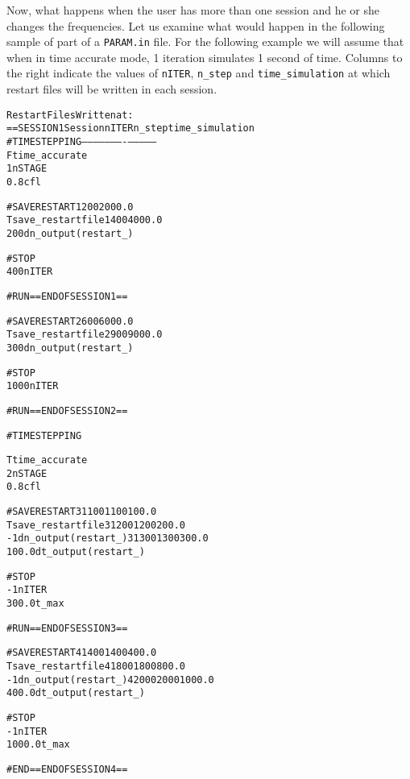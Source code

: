 Now, what happens when the user has more than one session and he or she
changes the frequencies.  Let us examine what would happen in the following
sample of part of a {\tt PARAM.in} file.  For the following example we will
assume that when in time accurate mode, 1 iteration simulates 1 second of time.
Columns to the right indicate the values of {\tt nITER}, {\tt n\_step} and
{\tt time\_simulation} at which restart files will be written in each session.
\begin{alltt}
                                             Restart Files Written at:
==SESSION 1       \hfill        Session   nITER   n_step   time_simulation
#TIMESTEPPING	  \hfill        --------  ------  -------  --------------
F       time_accurate  
1       nSTAGE         
0.8     cfl            

#SAVERESTART                      \hfill  1       200      200              0.0  
T            save_restartfile     \hfill  1       400      400              0.0
200          dn_output(restart_)

#STOP
400          nITER

#RUN ==END OF SESSION 1== 
                         
#SAVERESTART			  \hfill  2       600      600              0.0
T            save_restartfile	  \hfill  2       900      900              0.0
300          dn_output(restart_)
				
#STOP				
1000         nITER				
				
#RUN ==END OF SESSION 2== 
                          
#TIMESTEPPING 			
				
T       time_accurate  		
2       nSTAGE         		
0.8     cfl            		
				
#SAVERESTART			  \hfill  3      1100     1100            100.0
T            save_restartfile	  \hfill  3      1200     1200            200.0
-1           dn_output(restart_)  \hfill  3      1300     1300            300.0
100.0        dt_output(restart_)
				
#STOP				
-1           nITER				
300.0        t_max			
				
#RUN ==END OF SESSION 3== 
                          
#SAVERESTART                      \hfill   4      1400     1400            400.0
T            save_restartfile	  \hfill   4      1800     1800            800.0
-1           dn_output(restart_)  \hfill   4      2000     2000           1000.0
400.0        dt_output(restart_)
 				
#STOP				
-1           nITER				
1000.0       t_max				
				
#END  ==END OF SESSION 4== 
                           
                           
\end{alltt}
